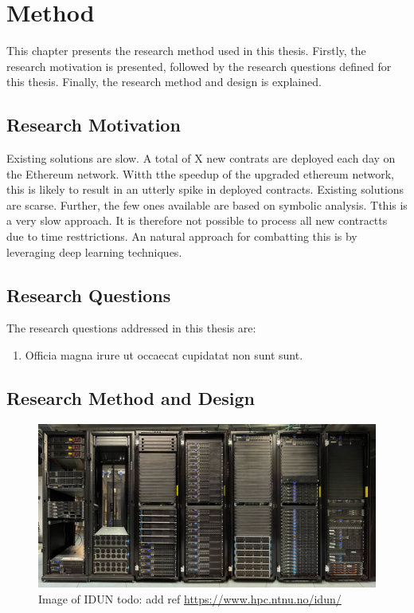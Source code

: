 \chapter{Method}
\label{chap:method}
This chapter presents the research method used in this thesis. Firstly, the research motivation is presented, followed by the research questions defined for this thesis. Finally, the research method and design is explained.

\section{Research Motivation}

Existing solutions are slow.
A total of X new contrats are deployed  each day on the Ethereum network. Witth tthe speedup of the upgraded ethereum network,  this is likely to result in an utterly spike  in deployed contracts. Existing solutions are scarse. Further, the few ones available are based on symbolic analysis.  Tthis is a very slow approach. It is therefore not possible to process all new contractts due to time resttrictions. An natural approach for combatting this is by leveraging deep learning techniques.





\section{Research Questions}
\label{sec:research-questions}
The research questions addressed in this thesis are:
\begin{enumerate}[label=RQ\arabic*., leftmargin=1.5cm]
    \item Officia magna irure ut occaecat cupidatat non sunt sunt.
\end{enumerate}

\section{Research Method and Design}
\label{sec:research-method-and-design}

\begin{figure}[htp]
    \centering
    \includegraphics[width=\textwidth]{figures/idun.jpeg}
    \caption{Image of IDUN todo: add ref \url{https://www.hpc.ntnu.no/idun/}}
    \label{fig:flowchart}
\end{figure}

